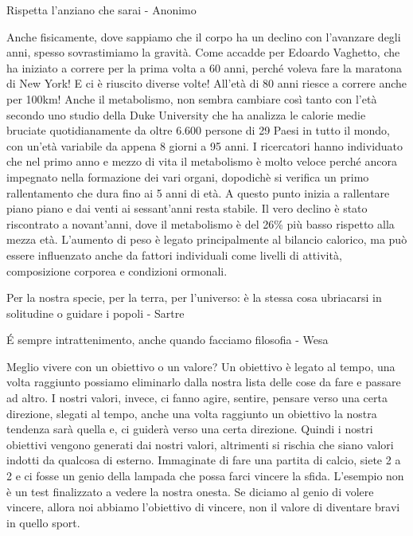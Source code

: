 \documentclass[12pt]{book} %
\begin{document}
\begin{mdframed}[linewidth=1pt]
Rispetta l'anziano che sarai - Anonimo

Anche fisicamente, dove sappiamo che il corpo ha un declino con l'avanzare degli anni, spesso
sovrastimiamo la gravità. Come accadde per Edoardo
Vaghetto, che ha iniziato a correre per la prima volta a 60 anni, perché voleva fare la maratona di New York! E ci è riuscito
diverse volte! All'età di 80 anni riesce a correre anche per 100km! Anche il metabolismo, non
sembra cambiare così tanto con l'età secondo uno studio della Duke
University che ha analizza le calorie medie bruciate
quotidianamente da oltre 6.600 persone di 29 Paesi in tutto il mondo, con un'età variabile da appena 8 giorni a 95
anni. I ricercatori hanno individuato che nel primo anno e mezzo di vita il metabolismo è molto veloce perché ancora
impegnato nella formazione dei vari organi, dopodichè si verifica un primo rallentamento che dura fino ai 5 anni di
età. A questo punto inizia a rallentare piano piano e dai venti ai sessant'anni resta stabile. 
Il vero declino è stato riscontrato a novant'anni, dove il metabolismo è del 26\% più basso
rispetto alla mezza età. L’aumento di peso è legato principalmente al bilancio calorico, ma può essere influenzato anche da fattori individuali come livelli di attività, composizione corporea e condizioni ormonali.
\end{mdframed}

Per la nostra specie, per la terra, per l'universo: è la stessa cosa ubriacarsi in solitudine o guidare i popoli - Sartre 

É sempre intrattenimento, anche quando facciamo filosofia - Wesa

Meglio vivere con un obiettivo o un valore?
Un obiettivo è legato al tempo, una volta raggiunto possiamo eliminarlo dalla nostra lista delle cose da fare e passare
ad altro. I nostri valori, invece, ci fanno agire, sentire, pensare verso una certa direzione, slegati al tempo, anche
una volta raggiunto un obiettivo la nostra tendenza sarà quella e, ci guiderà verso una certa direzione.
Quindi i nostri obiettivi vengono generati dai nostri valori, altrimenti si rischia che siano valori indotti da
qualcosa di esterno. Immaginate di fare una partita di calcio, siete 2 a 2 e ci fosse un genio della lampada che
possa farci vincere la sfida. L'esempio non è un test finalizzato a vedere la nostra onesta. Se diciamo al genio di
volere vincere, allora noi abbiamo l'obiettivo di vincere, non il valore di diventare bravi in quello sport.
\end{document}
